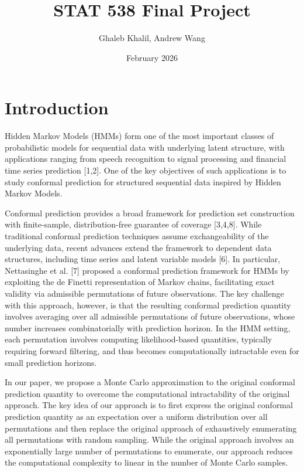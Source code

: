 \documentclass{article}
\title{STAT 538 Final Project}
\author{Ghaleb Khalil, Andrew Wang}
\date{February 2026}
\begin{document}
\maketitle

\section{Introduction}

Hidden Markov Models (HMMs) form one of the most important classes of probabilistic models for sequential data with underlying latent structure, with applications ranging from speech recognition to signal processing and financial time series prediction [1,2]. One of the key objectives of such applications is to study conformal prediction for structured sequential data inspired by Hidden Markov Models.

Conformal prediction provides a broad framework for prediction set construction with finite-sample, distribution-free guarantee of coverage [3,4,8]. While traditional conformal prediction techniques assume exchangeability of the underlying data, recent advances extend the framework to dependent data structures, including time series and latent variable models [6]. In particular, Nettasinghe et al. [7] proposed a conformal prediction framework for HMMs by exploiting the de Finetti representation of Markov chains, facilitating exact validity via admissible permutations of future observations. The key challenge with this approach, however, is that the resulting conformal prediction quantity involves averaging over all admissible permutations of future observations, whose number increases combinatorially with prediction horizon. In the HMM setting, each permutation involves computing likelihood-based quantities, typically requiring forward filtering, and thus becomes computationally intractable even for small prediction horizons.

In our paper, we propose a Monte Carlo approximation to the original conformal prediction quantity to overcome the computational intractability of the original approach. The key idea of our approach is to first express the original conformal prediction quantity as an expectation over a uniform distribution over all permutations and then replace the original approach of exhaustively enumerating all permutations with random sampling. While the original approach involves an exponentially large number of permutations to enumerate, our approach reduces the computational complexity to linear in the number of Monte Carlo samples.
\end{document}
